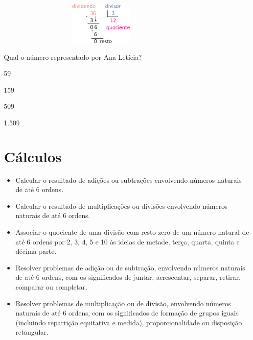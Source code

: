 \includegraphics[width=4.13369in,height=0.83341in]{media/image13.png}


Qual o número representado por Ana Letícia?

\begin{minipage}{.5\textwidth}
\begin{escolha}
\item
  59
\item
  159
\item
  509
\item
  1.509
\end{escolha}
\end{minipage}

\chapter{Cálculos}


\begin{itemize}
\item Calcular o resultado de adições ou subtrações envolvendo números
naturais de até 6 ordens.

\item Calcular o resultado de multiplicações ou divisões envolvendo números
naturais de até 6 ordens.

\item Associar o quociente de uma divisão com resto zero de um número
natural de até 6 ordens por 2, 3, 4, 5 e 10 às ideias de metade, terça,
quarta, quinta e décima parte.

\item Resolver problemas de adição ou de subtração, envolvendo números
naturais de até 6 ordens, com os significados de juntar, acrescentar,
separar, retirar, comparar ou completar.

\item Resolver problemas de multiplicação ou de divisão, envolvendo números
naturais de até 6 ordens, com os significados de formação de grupos
iguais (incluindo repartição equitativa e medida), proporcionalidade ou
disposição retangular.
\end{itemize}

